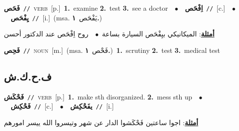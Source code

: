 \documentclass[10pt,a4paper,twoside]{article} %
\begin{document}
\begin{multicols}{2}
{\setlength\topsep{0pt}\textbf{\foreignlanguage{arabic}{فَحَص}}\ {\color{gray}\texttt{//}\color{black}}\ \textsc{verb}\ [p.]\ \textbf{1.}~examine  \textbf{2.}~test  \textbf{3.}~see a doctor\ \ $\bullet$\ \ \setlength\topsep{0pt}\textbf{\foreignlanguage{arabic}{اِفْحَص}}\ {\color{gray}\texttt{//}\color{black}}\ [c.]\ \ $\bullet$\ \ \setlength\topsep{0pt}\textbf{\foreignlanguage{arabic}{يِفْحَص}}\ {\color{gray}\texttt{//}\color{black}}\ [i.]\ \color{gray}(msa. \foreignlanguage{arabic}{يَفْحَص}~\foreignlanguage{arabic}{\textbf{١.}})\color{black}\  \begin{flushright}\color{gray}\foreignlanguage{arabic}{\textbf{\underline{\foreignlanguage{arabic}{أمثلة}}}: الميكانيكي بيِفْحَص السيارة بساعة\ $\bullet$\ \  روح اِفْحَص عند الدكتور أحسن}\end{flushright}\color{black}} \vspace{2mm}

{\setlength\topsep{0pt}\textbf{\foreignlanguage{arabic}{فَحِص}}\ {\color{gray}\texttt{//}\color{black}}\ \textsc{noun}\ [m.]\ \color{gray}(msa. \foreignlanguage{arabic}{فَحْص}~\foreignlanguage{arabic}{\textbf{١.}})\color{black}\ \textbf{1.}~scrutiny  \textbf{2.}~test  \textbf{3.}~medical test\ } \vspace{2mm}

\vspace{-3mm}
\subsection*{\color{blue}\foreignlanguage{arabic}{ف.ح.ك.ش}\color{blue}{}} 

{\setlength\topsep{0pt}\textbf{\foreignlanguage{arabic}{فَحْكَش}}\ {\color{gray}\texttt{//}\color{black}}\ \textsc{verb}\ [p.]\ \textbf{1.}~make sth disorganized.  \textbf{2.}~mess sth up\ \ $\bullet$\ \ \setlength\topsep{0pt}\textbf{\foreignlanguage{arabic}{فَحْكِش}}\ {\color{gray}\texttt{//}\color{black}}\ [c.]\ \ $\bullet$\ \ \setlength\topsep{0pt}\textbf{\foreignlanguage{arabic}{يفَحْكِش}}\ {\color{gray}\texttt{//}\color{black}}\ [i.]\  \begin{flushright}\color{gray}\foreignlanguage{arabic}{\textbf{\underline{\foreignlanguage{arabic}{أمثلة}}}: اجوا ساعتين فَحْكَشوا الدار عن شهر وتيسروا الله ييسر امورهم}\end{flushright}\color{black}} \vspace{2mm}


\end{multicols}
\end{document}
